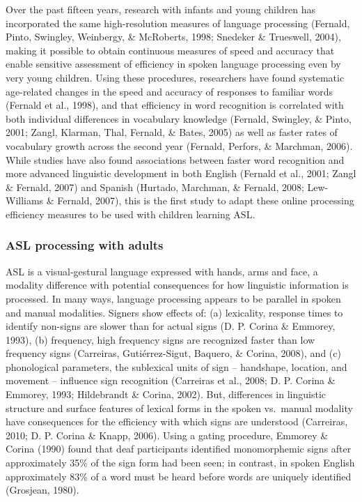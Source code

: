 \documentclass[12pt,]{article}
\begin{document}
Over the past fifteen years, research with infants and young children
has incorporated the same high-resolution measures of language
processing (Fernald, Pinto, Swingley, Weinbergy, \& McRoberts, 1998;
Snedeker \& Trueswell, 2004), making it possible to obtain continuous
measures of speed and accuracy that enable sensitive assessment of
efficiency in spoken language processing even by very young children.
Using these procedures, researchers have found systematic age-related
changes in the speed and accuracy of responses to familiar words
(Fernald et al., 1998), and that efficiency in word recognition is
correlated with both individual differences in vocabulary knowledge
(Fernald, Swingley, \& Pinto, 2001; Zangl, Klarman, Thal, Fernald, \&
Bates, 2005) as well as faster rates of vocabulary growth across the
second year (Fernald, Perfors, \& Marchman, 2006). While studies have
also found associations between faster word recognition and more
advanced linguistic development in both English (Fernald et al., 2001;
Zangl \& Fernald, 2007) and Spanish (Hurtado, Marchman, \& Fernald,
2008; Lew-Williams \& Fernald, 2007), this is the first study to adapt
these online processing efficiency measures to be used with children
learning ASL.

\subsubsection{ASL processing with
adults}\label{asl-processing-with-adults}

ASL is a visual-gestural language expressed with hands, arms and face, a
modality difference with potential consequences for how linguistic
information is processed. In many ways, language processing appears to
be parallel in spoken and manual modalities. Signers show effects of:
(a) lexicality, response times to identify non-signs are slower than for
actual signs (D. P. Corina \& Emmorey, 1993), (b) frequency, high
frequency signs are recognized faster than low frequency signs
(Carreiras, Guti{é}rrez-Sigut, Baquero, \& Corina, 2008), and (c)
phonological parameters, the sublexical units of sign -- handshape,
location, and movement -- influence sign recognition (Carreiras et al.,
2008; D. P. Corina \& Emmorey, 1993; Hildebrandt \& Corina, 2002). But,
differences in linguistic structure and surface features of lexical
forms in the spoken vs.~manual modality have consequences for the
efficiency with which signs are understood (Carreiras, 2010; D. P.
Corina \& Knapp, 2006). Using a gating procedure, Emmorey \& Corina
(1990) found that deaf participants identified monomorphemic signs after
approximately 35\% of the sign form had been seen; in contrast, in
spoken English approximately 83\% of a word must be heard before words
are uniquely identified (Grosjean, 1980).
\end{document}
